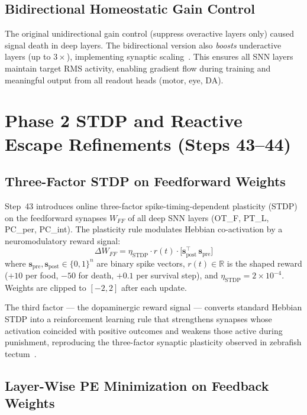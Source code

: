 \documentclass[11pt,a4paper]{article}
\begin{document}
\subsection{Bidirectional Homeostatic Gain Control}

The original unidirectional gain control (suppress overactive layers only)
caused signal death in deep layers.  The bidirectional version also
\emph{boosts} underactive layers (up to $3\times$), implementing synaptic
scaling~\cite{turrigiano2008}.  This ensures all SNN layers maintain
target RMS activity, enabling gradient flow during training and meaningful
output from all readout heads (motor, eye, DA).

\section{Phase 2 STDP and Reactive Escape Refinements (Steps 43--44)}\label{sec:phase2}

\subsection{Three-Factor STDP on Feedforward Weights}\label{sec:stdp_ff}

Step~43 introduces online three-factor spike-timing-dependent plasticity
(STDP)~\cite{fremaux2016} on the feedforward synapses $W_{FF}$ of all deep
SNN layers (OT\_F, PT\_L, PC\_per, PC\_int).  The plasticity rule modulates
Hebbian co-activation by a neuromodulatory reward signal:
\begin{equation}
  \Delta W_{FF} = \eta_{\text{STDP}} \cdot r(t) \cdot
    \bigl[\mathbf{s}_{\text{post}}^\top \, \mathbf{s}_{\text{pre}}\bigr]
\end{equation}
where $\mathbf{s}_{\text{pre}}, \mathbf{s}_{\text{post}} \in \{0,1\}^n$ are
binary spike vectors, $r(t) \in \mathbb{R}$ is the shaped reward
($+10$ per food, $-50$ for death, $+0.1$ per survival step),
and $\eta_{\text{STDP}} = 2\times10^{-4}$.
Weights are clipped to $[-2, 2]$ after each update.

The third factor --- the dopaminergic reward signal --- converts standard
Hebbian STDP into a reinforcement learning rule that strengthens
synapses whose activation coincided with positive outcomes and weakens those
active during punishment, reproducing the three-factor synaptic plasticity
observed in zebrafish tectum~\cite{bhatt2009}.

\subsection{Layer-Wise PE Minimization on Feedback Weights}\label{sec:pe_min}
\end{document}
